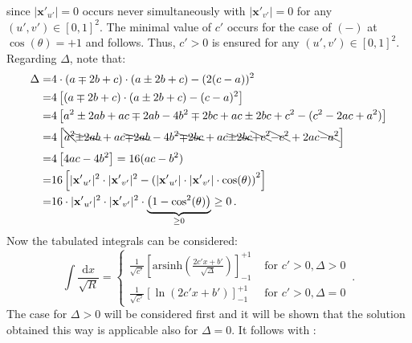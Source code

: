 since $|{\mathbf{x}'}_{u'}|=0$ occurs never simultaneously with $|{\mathbf{x}'}_{v'}|=0$ for any $(u', v') \in [0,1]^2$.
The minimal value of $c'$ occurs for the case of $(-)$ at $\cos(\theta)=+1$ and  follows.
Thus, ${c'}>0$ is ensured for any $(u', v') \in [0,1]^2$.
Regarding $\Delta$, note that:
\begin{align}
 \Delta =& 4 \cdot (a \mp 2 b + c) \cdot (a \pm 2 b + c) - (2 (c-a))^2 \nonumber \\
    ~   =& 4 \left[ (a \mp 2 b + c) \cdot (a \pm 2 b + c) - (c-a)^2 \right] \nonumber \\
    ~   =& 4 \left[ a^2 \pm 2 a b + a c \mp 2 a b - 4 b^2 \mp 2 b c + a c \pm 2 b c + c^2 - (c^2 - 2 a c + a^2) \right] \nonumber \\
    ~   =& 4 \left[ \bcancel{a^2} \bcancel{\pm 2 a b} + a c \bcancel{\mp 2 a b} - 4 b^2 \bcancel{\mp 2 b c} + a c \bcancel{\pm 2 b c} \bcancel{+ c^2} \bcancel{- c^2} + 2 a c \bcancel{- a^2} \right] \nonumber \\
    ~   =& 4 \left[ 4 a c - 4 b^2 \right] = 16 (a c - b^2) \label{eqn:def_delta_simple} \\
    ~   =& 16 \left[ |{\mathbf{x}'}_{u'}|^2 \cdot |{\mathbf{x}'}_{v'}|^2 - \left( |{\mathbf{x}'}_{u'}| \cdot |{\mathbf{x}'}_{v'}| \cdot \cos(\theta) \right)^2 \right] \nonumber \\
    ~   =& 16 \cdot |{\mathbf{x}'}_{u'}|^2 \cdot |{\mathbf{x}'}_{v'}|^2 \cdot \underbrace{\left( 1 - \cos^2(\theta) \right)}_{\geq 0} \geq 0 \, .
\end{align}
Now the tabulated integrals can be considered:
\begin{equation}
 \int \frac{\mathrm{d}x}{\sqrt{R}} =
 \begin{cases}
  \frac{1}{\sqrt{c'}} \left[ \mathrm{arsinh}\left( \frac{2 c' x + b'}{\sqrt{\Delta}} \right) \right]_{-1}^{+1} & \textrm{ for } {c'}>0, \Delta>0 \\
  \frac{1}{\sqrt{c'}} \left[ \ln            \left(       2 c' x + b'                 \right) \right]_{-1}^{+1} & \textrm{ for } {c'}>0, \Delta=0
 \end{cases} \, . \label{eqn:int_oosr}
\end{equation}
The case for $\Delta>0$ will be considered first and it will be shown that the solution obtained this way is applicable also for $\Delta=0$.
It follows with :
